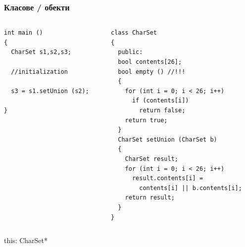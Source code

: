 \documentclass{beamer}
\begin{document}
\begin{frame}[fragile]
\frametitle{Класове / обекти}


\begin{columns}[t]
  \begin{column}{0.5\textwidth}
\begin{flushleft}
\begin{lstlisting}
int main ()
{
  CharSet s1,s2,s3;

  //initialization

  s3 = s1.setUnion (s2);

}
\end{lstlisting}
\end{flushleft}
  \end{column}
  \begin{column}{0.5\textwidth}
\begin{flushleft}
\begin{lstlisting}
class CharSet
{
  public:
  bool contents[26];
  bool empty () //!!!
  {
    for (int i = 0; i < 26; i++)
      if (contents[i])
        return false;
    return true;
  }
  CharSet setUnion (CharSet b)
  {
    CharSet result;
    for (int i = 0; i < 26; i++)
      result.contents[i] =
        contents[i] || b.contents[i];
    return result;
  }
}
\end{lstlisting}
\end{flushleft}

  \end{column}
\end{columns}


\end{frame}


\begin{frame}
\centerline{this: CharSet*}
\end{frame}
\end{document}
